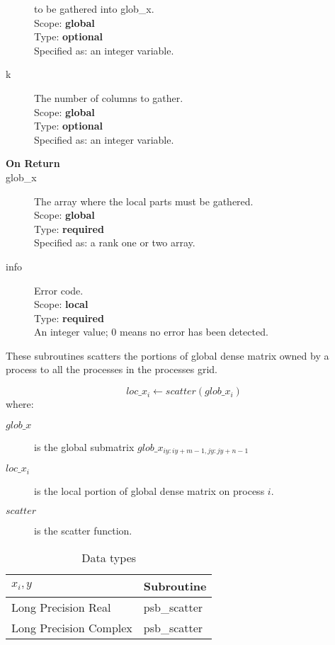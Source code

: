 \begin{description}
  to be gathered into glob\_x.\\
Scope: {\bf global} \\
Type: {\bf optional}\\
Specified as: an integer variable.
\item[k]  The number of columns to gather.\\
Scope: {\bf global} \\
Type: {\bf optional}\\
Specified as: an integer variable. 
\item[\bf On Return] 
\item[glob\_x] The array where the local parts must be gathered.\\
Scope: {\bf global} \\
Type: {\bf required}\\
Specified as: a rank one or two array.
\item[info] Error code.\\
Scope: {\bf local} \\
Type: {\bf required} \\
An integer value; 0 means no error has been detected. 
\end{description}

%
%


These subroutines scatters the portions of global dense matrix owned
by a process to all the processes in the processes grid.

\[ loc\_x_i \leftarrow scatter(glob\_x_i) \]
where:
\begin{description}
\item[$glob\_x$] is the global submatrix $glob\_x_{iy:iy+m-1,jy:jy+n-1}$
\item[$loc\_x_i$] is the local portion of global dense matrix on
process $i$.
\item[$scatter$] is the scatter function.
\end{description}

\begin{table}[h]
\begin{center}
\begin{tabular}{ll}
\hline
$x_i, y$ & {\bf Subroutine}\\
\hline
Long Precision Real & psb\_scatter \\
Long Precision Complex & psb\_scatter \\
\hline
\end{tabular}
\end{center}
\caption{Data types\label{tab:scatter}}
\end{table}

